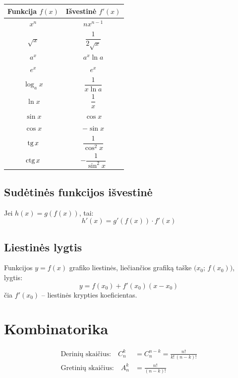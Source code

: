 \begin{center}
\begin{tabular}{|c|c|}
\hline
\textbf{Funkcija} $f(x)$ & \textbf{Išvestinė} $f'(x)$ \\
\hline
$x^n$          & $nx^{n-1}$ \\[4pt]
\hline
$\sqrt{x}$     & $\dfrac{1}{2\sqrt{x}}$ \\[8pt]
\hline
$a^x$          & $a^x \ln a$ \\[4pt]
\hline
$e^x$          & $e^x$ \\[4pt]
\hline
$\log_a x$     & $\dfrac{1}{x \ln a}$ \\[8pt]
\hline
$\ln x$        & $\dfrac{1}{x}$ \\[8pt]
\hline
$\sin x$       & $\cos x$ \\[4pt]
\hline
$\cos x$       & $-\sin x$ \\[4pt]
\hline
$\operatorname{tg} x$        & $\dfrac{1}{\cos^2 x}$ \\[8pt]
\hline
$\operatorname{ctg} x$       & $-\dfrac{1}{\sin^2 x}$ \\[8pt]
\hline
\end{tabular}
\end{center}

\subsection{Sudėtinės funkcijos išvestinė}

Jei $h(x) = g(f(x))$, tai:
\[
h'(x) = g'(f(x)) \cdot f'(x)
\]

\subsection{Liestinės lygtis}

Funkcijos $y = f(x)$ grafiko liestinės, liečiančios grafiką taške
$\bigl(x_0;\, f(x_0)\bigr)$, lygtis:
\[
y = f(x_0) + f'(x_0)(x - x_0)
\]
čia $f'(x_0)$ – liestinės krypties koeficientas.

\section{Kombinatorika}

\begin{align}
\text{Derinių skaičius:} \quad
C_n^k &= C_n^{n-k} = \frac{n!}{k!\,(n-k)!} \\[10pt]
\text{Gretinių skaičius:} \quad
A_n^k &= \frac{n!}{(n-k)!}
\end{align}


